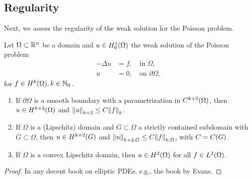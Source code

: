 \subsection{Regularity}

Next, we assess the regularity of the weak solution for the Poisson problem.

\begin{theorem}
	Let \(\Omega \subset \mathbb{R}^n\) be a domain and \(u \in H_0^1\parentheses*{\Omega}\) the weak solution of the Poisson problem
	\begin{align*}
		-\Delta u &= f, \quad \text{in }\Omega,\\
		u &= 0, \quad \text{on }\partial\Omega,
	\end{align*}
	for \(f \in H^k\parentheses*{\Omega}, k \in \N_0\).
	\begin{enumerate}
		\item\label{theorem:3-11:1} If \(\partial\Omega\) is a smooth boundary with a parametrization in \(C^{k + 2}\parentheses*{\Omega}\), then \(u \in H^{k + 2}\parentheses*{\Omega}\) and \(\norm*{u}_{k + 2} \le C\norm*{f}_k\).
		\item\label{theorem:3-11:2} If \(\Omega\) is a (Lipschitz) domain and \(G \subset \Omega\) a strictly contained subdomain with \(\bar{G} \subset \Omega\), then \(u \in H^{k + 2}\parentheses*{G}\) and \(\norm*{u}_{k + 2, G} \le C\norm*{f}_{k, \Omega}\), with \(C = C\parentheses*{G}\).
		\item If \(\Omega\) is a convex Lipschitz domain, then \(u \in H^2\parentheses*{\Omega}\) for all \(f \in L^2\parentheses*{\Omega}\).
	\end{enumerate}
\end{theorem}

\begin{proof}
	In any decent book on elliptic PDEs, e.g., the book by Evans.
\end{proof}

